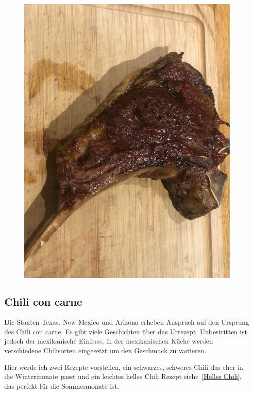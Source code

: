 \begin{figure}[htbp]
	\centering
	\begin{minipage}{1\textwidth}
	\centering
	\includegraphics[width=.9\linewidth]{pics/Tomahawk_gegrillt}
	\label{fig:Toma2}
	\end{minipage}
\end{figure}
\newpage

\subsection{Chili con carne}
Die Staaten Texas, New Mexico und Arizona erheben Anspruch auf den Ursprung des Chili con carne. Es gibt viele Geschichten über das Urrezept. Unbestritten ist jedoch 
der mexikanische Einfluss, in der mexikanischen Küche werden verschiedene 
Chilisorten eingesetzt um den Geschmack zu variieren.

Hier werde ich zwei Rezepte vorstellen, ein schwarzes, schweres Chili das 
eher in die Wintermonate passt und ein leichtes helles Chili Rezept 
siehe~\vref{Helles Chili}, das perfekt für die Sommermonate ist.

